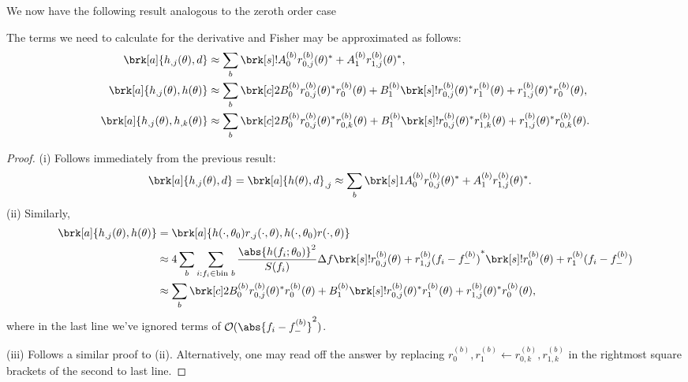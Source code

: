 We now have the following result analogous to the zeroth order case
\begin{proposition}[]\label{}
The terms we need to calculate for the derivative and Fisher may be approximated as follows:
\begin{align*}
\brk[a]{h_{,j}(\theta),d} &\approx \sum_b \brk[s]!{A_0^{(b)} r_{0,j}^{(b)} (\theta)^* + A_1^{(b)} r_{1,j}^{(b)}(\theta)^*}, \\
\brk[a]{h_{,j}(\theta), h(\theta)} &\approx \sum_b \brk[c]2{B_0^{(b)} r_{0,j}^{(b)}(\theta)^* r_0^{(b)}(\theta) + B_1^{(b)} \brk[s]!{r_{0,j}^{(b)}(\theta)^* r_1^{(b)}(\theta) + r_{1,j}^{(b)}(\theta)^* r_0^{(b)}(\theta)}}, \\
\brk[a]{h_{,j}(\theta), h_{,k}(\theta)} &\approx \sum_b \brk[c]2{B_0^{(b)} r_{0,j}^{(b)}(\theta)^* r_{0,k}^{(b)}(\theta) + B_1^{(b)} \brk[s]!{r_{0,j}^{(b)}(\theta)^* r_{1,k}^{(b)}(\theta) + r_{1,j}^{(b)}(\theta)^* r_{0,k}^{(b)}(\theta)}}.
\end{align*}
\end{proposition}
\begin{proof}
(i) Follows immediately from the previous result:
\begin{align*}
\brk[a]{h_{,j}(\theta), d} &= \brk[a]{h(\theta), d}_{,j}
\approx \sum_b \brk[s]1{A_0^{(b)} r_{0,j}^{(b)}(\theta)^* + A_1^{(b)} r_{1,j}^{(b)}(\theta)^*}.
\end{align*}
(ii) Similarly,
\begin{align*}
\brk[a]{h_{,j}(\theta), h(\theta)} &= \brk[a]{h(\cdot,\theta_0) r_{,j}(\cdot,\theta), h(\cdot,\theta_0) r(\cdot,\theta)}\\
&\approx 4 \sum_b \sum_{i:f_i \in \text{bin } b}\frac{\abs{h(f_i;\theta_0)}^2}{S(f_i)}\Delta f \brk[s]!{r_{0,j}^{(b)}(\theta) + r_{1,j}^{(b)}(f_i-f_-^{(b)})}^* \brk[s]!{r_{0}^{(b)}(\theta) + r_{1}^{(b)}(f_i-f_-^{(b)})} \\
&\approx \sum_b \brk[c]2{B_0^{(b)} r_{0,j}^{(b)}(\theta)^* r_0^{(b)}(\theta) + B_1^{(b)} \brk[s]!{r_{0,j}^{(b)}(\theta)^* r_1^{(b)}(\theta) + r_{1,j}^{(b)}(\theta)^* r_0^{(b)}(\theta)}},
\end{align*}
where in the last line we've ignored terms of $\order(\abs{f_i - f_-^{(b)}}^2)$.

(iii) Follows a similar proof to (ii). Alternatively, one may read off the answer by replacing $r_0^{(b)}, r_1^{(b)} \leftarrow r_{0,k}^{(b)}, r_{1,k}^{(b)}$ in the rightmost square brackets of the second to last line.
\end{proof}


